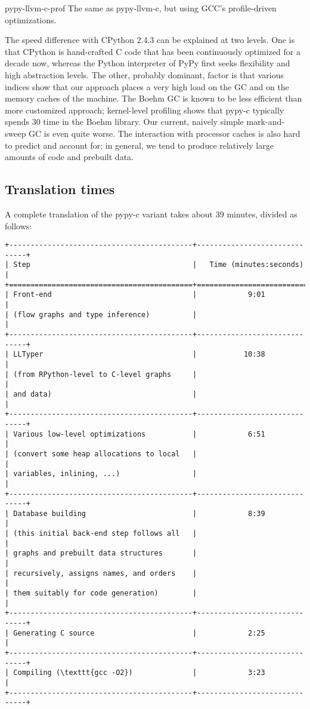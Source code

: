 \documentclass{acm_proc_article-sp}
\begin{document}
pypy-llvm-c-prof
    The same as pypy-llvm-c, but using GCC's profile-driven
    optimizations.

The speed difference with CPython 2.4.3 can be explained at two levels.
One is that CPython is hand-crafted C code that has been continuously
optimized for a decade now, whereas the Python interpreter of PyPy first
seeks flexibility and high abstraction levels.  The other, probably
dominant, factor is that various indices show that our approach places a
very high load on the GC and on the memory caches of the machine.  The
Boehm GC is known to be less efficient than more customized approach;
kernel-level profiling shows that pypy-c typically spends 30%
time in the Boehm library.  Our current, naively simple mark-and-sweep
GC is even quite worse.  The interaction with processor caches is also
hard to predict and account for; in general, we tend to produce
relatively large amounts of code and prebuilt data.


\subsection{Translation times}

A complete translation of the pypy-c variant takes about 39 minutes,
divided as follows:

\begin{verbatim}
+-------------------------------------------+------------------------------+
| Step                                      |   Time (minutes:seconds)     |
+===========================================+==============================+
| Front-end                                 |            9:01              |
| (flow graphs and type inference)          |                              |
+-------------------------------------------+------------------------------+
| LLTyper                                   |           10:38              |
| (from RPython-level to C-level graphs     |                              |
| and data)                                 |                              |
+-------------------------------------------+------------------------------+
| Various low-level optimizations           |            6:51              |
| (convert some heap allocations to local   |                              |
| variables, inlining, ...)                 |                              |
+-------------------------------------------+------------------------------+
| Database building                         |            8:39              |
| (this initial back-end step follows all   |                              |
| graphs and prebuilt data structures       |                              |
| recursively, assigns names, and orders    |                              |
| them suitably for code generation)        |                              |
+-------------------------------------------+------------------------------+
| Generating C source                       |            2:25              |
+-------------------------------------------+------------------------------+
| Compiling (\texttt{gcc -O2})              |            3:23              |
+-------------------------------------------+------------------------------+
\end{verbatim}
\end{document}

